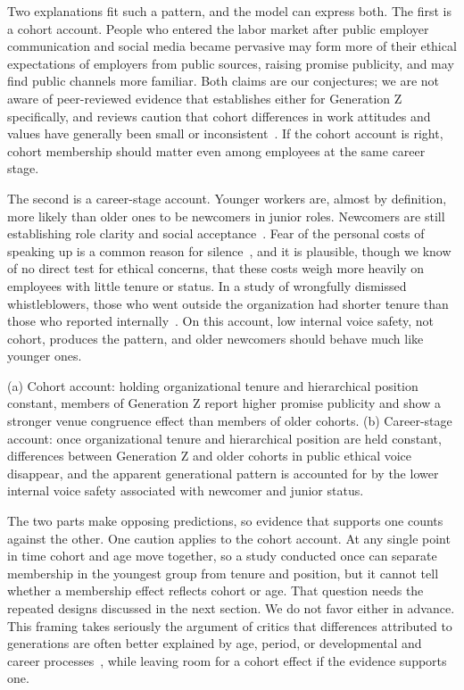 Two explanations fit such a pattern, and the model can express both. The first is a cohort account. People who entered the labor market after public employer communication and social media became pervasive may form more of their ethical expectations of employers from public sources, raising promise publicity, and may find public channels more familiar. Both claims are our conjectures; we are not aware of peer-reviewed evidence that establishes either for Generation Z specifically, and reviews caution that cohort differences in work attitudes and values have generally been small or inconsistent~\citep{costanza2012generational,parry2011generational,rudolph2021generations}. If the cohort account is right, cohort membership should matter even among employees at the same career stage.

The second is a career-stage account. Younger workers are, almost by definition, more likely than older ones to be newcomers in junior roles. Newcomers are still establishing role clarity and social acceptance~\citep{bauer2007newcomer}. Fear of the personal costs of speaking up is a common reason for silence~\citep{milliken2003exploratory,kishgephart2009silenced}, and it is plausible, though we know of no direct test for ethical concerns, that these costs weigh more heavily on employees with little tenure or status. In a study of wrongfully dismissed whistleblowers, those who went outside the organization had shorter tenure than those who reported internally~\citep{dworkin1998internal}. On this account, low internal voice safety, not cohort, produces the pattern, and older newcomers should behave much like younger ones.

\begin{proposition}
(a) Cohort account: holding organizational tenure and hierarchical position constant, members of Generation Z report higher promise publicity and show a stronger venue congruence effect than members of older cohorts. (b) Career-stage account: once organizational tenure and hierarchical position are held constant, differences between Generation Z and older cohorts in public ethical voice disappear, and the apparent generational pattern is accounted for by the lower internal voice safety associated with newcomer and junior status.
\end{proposition}

The two parts make opposing predictions, so evidence that supports one counts against the other. One caution applies to the cohort account. At any single point in time cohort and age move together, so a study conducted once can separate membership in the youngest group from tenure and position, but it cannot tell whether a membership effect reflects cohort or age. That question needs the repeated designs discussed in the next section. We do not favor either in advance. This framing takes seriously the argument of critics that differences attributed to generations are often better explained by age, period, or developmental and career processes~\citep{rudolph2017considering,rudolph2021generations}, while leaving room for a cohort effect if the evidence supports one.
